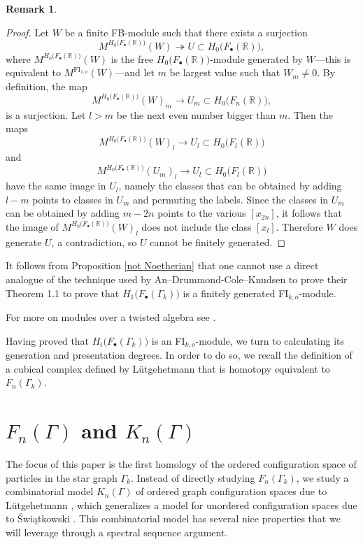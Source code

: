 \documentclass[pagebackref,colorlinks,citecolor=blue,linkcolor=blue,urlcolor=blue,filecolor=blue]{article}
\theoremstyle{definition}\newtheorem{definition}[thm]{Definition}
\theoremstyle{definition}
\newtheorem{remark}[thm]{Remark}
\newcommand{\R}{\ensuremath{\mathbb{R}}}
\begin{document}
\begin{remark}
\begin{proof}
Let $W$ be a finite FB-module such that there exists a surjection
\[
M^{H_{0}\big(F_{\bullet}(\R)\big)}(W)\twoheadrightarrow U\subset H_{0}\big(F_{\bullet}(\R)\big),
\] 
where $M^{H_{0}\big(F_{\bullet}(\R)\big)}(W)$ is the free $H_{0}\big(F_{\bullet}(\R)\big)$-module generated by $W$---this is equivalent to $M^{\text{FI}_{1,o}}(W)$---and let $m$ be largest value such that $W_{m}\neq 0$.
By definition, the map
\[
M^{H_{0}\big(F_{\bullet}(\R)\big)}(W)_{m}\to U_{m}\subset H_{0}\big(F_{n}(\R)\big),
\] 
is a surjection.
Let $l>m$ be the next even number bigger than $m$.
Then the maps
\[
M^{H_{0}\big(F_{\bullet}(\R)\big)}(W)_{l}\to U_{l}\subset H_{0}\big(F_{l}(\R)\big)
\]
and
\[
M^{H_{0}\big(F_{\bullet}(\R)\big)}(U_{m})_{l}\to U_{l}\subset H_{0}\big(F_{l}(\R)\big)
\]
have the same image in $U_{l}$, namely the classes that can be obtained by adding $l-m$ points to classes in $U_{m}$ and permuting the labels.
Since the classes in $U_{m}$ can be obtained by adding $m-2n$ points to the various $[x_{2n}]$, it follows that the image of $M^{H_{0}\big(F_{\bullet}(\R)\big)}(W)_{l}$ does not include the class $[x_{l}]$.
Therefore $W$ does generate $U$, a contradiction, so $U$ cannot be finitely generated.
\end{proof}

It follows from Proposition \ref{not Noetherian} that one cannot use a direct analogue of the technique used by An--Drummond-Cole--Knudsen to prove their Theorem 1.1 \cite[Theorem 1.1]{an2020edge} to prove that $H_{1}\big(F_{\bullet}(\Gamma_{k})\big)$ is a finitely generated FI$_{k,o}$-module.

For more on modules over a twisted algebra see \cite{sam2012introduction}.
\end{remark}

Having proved that $H_{i}\big(F_{\bullet}(\Gamma_{k})\big)$ is an FI$_{k,o}$-module, we turn to calculating its generation and presentation degrees.
In order to do so, we recall the definition of a cubical complex defined by L\"{u}tgehetmann that is homotopy equivalent to $F_{n}(\Gamma_{k})$.

\section{$F_{n}(\Gamma)$ and $K_{n}(\Gamma)$}\label{cube complex}

The focus of this paper is the first homology of the ordered configuration space of particles in the star graph $\Gamma_{k}$.
Instead of directly studying $F_{n}(\Gamma_{k})$, we study a combinatorial model $K_{n}(\Gamma)$ of ordered graph configuration spaces due to L\"{u}tgehetmann \cite{lu14}, which generalizes a model for unordered configuration spaces due to {\'S}wi{\k{a}}tkowski \cite{swikatkowski2001estimates}.
This combinatorial model has several nice properties that we will leverage through a spectral sequence argument.
\end{document}
